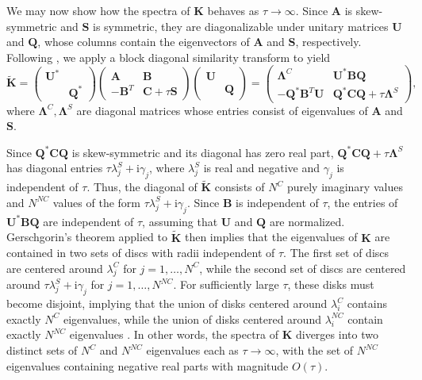\documentclass[10pt]{article}
\newcommand{\mi}{\mathrm{i}} %
\newcommand{\note}[1]{{\color{blue}#1}}
\begin{document}
We may now show how the spectra of $\bm{K}$ behaves as $\tau \rightarrow \infty$.  Since $\bm{A}$ is skew-symmetric and $\bm{S}$ is symmetric, they are diagonalizable under unitary matrices $\bm{U}$ and $\bm{Q}$, whose columns contain the eigenvectors of $\bm{A}$ and $\bm{S}$, respectively.   
Following \cite{Warburton20063205}, we apply a block diagonal similarity transform to yield
\[
\tilde{\bm{K}} = \left(\begin{array}{cc}
\bm{U}^* & \\
& \bm{Q}^*
\end{array}\right)
\left(\begin{array}{cc}
\bm{A} & \bm{B}\\
-\bm{B}^T & \bm{C} + \tau \bm{S}
\end{array}\right)
\left(\begin{array}{cc}
\bm{U} & \\
& \bm{Q}
\end{array}\right)
 = \left(\begin{array}{cc}
\bm{\Lambda}^C & \bm{U}^*\bm{B}\bm{Q}\\
-\bm{Q}^*\bm{B}^T\bm{U} & \bm{Q}^*\bm{C}\bm{Q} + \tau \bm{\Lambda}^{S}
\end{array}\right),
\]
where $\bm{\Lambda}^C,\bm{\Lambda}^{S}$ are diagonal matrices whose entries consist of eigenvalues of $\bm{A}$ and $\bm{S}$.  

Since $\bm{Q}^*\bm{C}\bm{Q}$ is skew-symmetric and its diagonal has zero real part, $\bm{Q}^*\bm{C}\bm{Q} + \tau \bm{\Lambda}^{S}$ has diagonal entries $\tau \lambda^S_j + \mi\gamma_j$, where $\lambda^S_j$ is real and negative and $\gamma_j$ is independent of $\tau$.  Thus, the diagonal of $\tilde{\bm{K}}$ consists of $N^C$ purely imaginary values and $N^{NC}$ values of the form $\tau \lambda^S_j + \mi\gamma_j$.  Since $\bm{B}$ is independent of $\tau$, the entries of $\bm{U}^*\bm{B}\bm{Q}$ are independent of $\tau$, assuming that $\bm{U}$ and $\bm{Q}$ are normalized.  Gerschgorin's theorem applied to $\tilde{\bm{K}}$ then implies that the eigenvalues of $\bm{K}$ are contained in two sets of discs with radii independent of $\tau$.  The first set of discs are centered around $\lambda^C_j$ for $j = 1,\ldots,N^C$, while the second set of discs are centered around $\tau\lambda^S_j + \mi\gamma_j$ for $j = 1,\ldots,N^{NC}$. For sufficiently large $\tau$, these disks must become disjoint, implying that the union of disks centered around  $\lambda^C_i$ contains exactly $N^C$ eigenvalues, while the union of disks centered around  $\lambda^{NC}_i$ contain exactly $N^{NC}$ eigenvalues \cite{horn2012matrix}.  In other words, the spectra of $\bm{K}$ diverges into two distinct sets of $N^C$ and $N^{NC}$ eigenvalues each as $\tau \rightarrow \infty$, with the set of $N^{NC}$ eigenvalues containing negative real parts with magnitude $O(\tau)$.  
\end{document}
